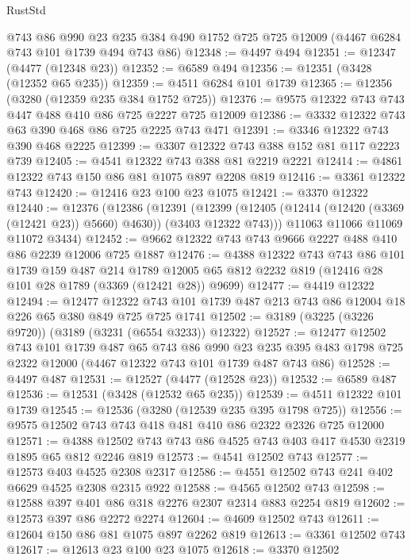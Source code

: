 \begin{lexlean}{RustStd}
\begin{coremodule}
    @743
    @86
    @990
    @23
    @235
    @384
    @490
    @1752
    @725
    @725
    @12009
    (@4467 @6284 @743 @101 @1739 @494 @743 @86)
@12348 := @4497 @494
@12351 := @12347 (@4477 (@12348 @23))
@12352 := @6589 @494
@12356 := @12351 (@3428 (@12352 @65 @235))
@12359 := @4511 @6284 @101 @1739
@12365 := @12356 (@3280 (@12359 @235 @384 @1752 @725))
@12376 := @9575 @12322 @743 @743 @447 @488 @410 @86 @725 @2227 @725 @12009
@12386 := @3332 @12322 @743 @63 @390 @468 @86 @725 @2225 @743 @471
@12391 := @3346 @12322 @743 @390 @468 @2225
@12399 := @3307 @12322 @743 @388 @152 @81 @117 @2223 @739
@12405 := @4541 @12322 @743 @388 @81 @2219 @2221
@12414 := @4861 @12322 @743 @150 @86 @81 @1075 @897 @2208 @819
@12416 := @3361 @12322 @743
@12420 := @12416 @23 @100 @23 @1075
@12421 := @3370 @12322
@12440 := @12376
    (@12386
      (@12391
        (@12399 (@12405 (@12414 (@12420 (@3369 (@12421 @23)) @5660) @4630)) (@3403 @12322 @743)))
      @11063
      @11066
      @11069
      @11072
      @3434)
@12452 := @9662 @12322 @743 @743 @9666 @2227 @488 @410 @86 @2239 @12006 @725 @1887
@12476 := @4388
    @12322
    @743
    @743
    @86
    @101
    @1739
    @159
    @487
    @214
    @1789
    @12005
    @65
    @812
    @2232
    @819
    (@12416 @28 @101 @28 @1789 (@3369 (@12421 @28)) @9699)
@12477 := @4419 @12322
@12494 := @12477
    @12322
    @743
    @101
    @1739
    @487
    @213
    @743
    @86
    @12004
    @18
    @226
    @65
    @380
    @849
    @725
    @725
    @1741
@12502 := @3189 (@3225 (@3226 @9720)) (@3189 (@3231 (@6554 @3233)) @12322)
@12527 := @12477
    @12502
    @743
    @101
    @1739
    @487
    @65
    @743
    @86
    @990
    @23
    @235
    @395
    @483
    @1798
    @725
    @2322
    @12000
    (@4467 @12322 @743 @101 @1739 @487 @743 @86)
@12528 := @4497 @487
@12531 := @12527 (@4477 (@12528 @23))
@12532 := @6589 @487
@12536 := @12531 (@3428 (@12532 @65 @235))
@12539 := @4511 @12322 @101 @1739
@12545 := @12536 (@3280 (@12539 @235 @395 @1798 @725))
@12556 := @9575 @12502 @743 @743 @418 @481 @410 @86 @2322 @2326 @725 @12000
@12571 := @4388 @12502 @743 @743 @86 @4525 @743 @403 @417 @4530 @2319 @1895 @65 @812 @2246 @819
@12573 := @4541 @12502 @743
@12577 := @12573 @403 @4525 @2308 @2317
@12586 := @4551 @12502 @743 @241 @402 @6629 @4525 @2308 @2315 @922
@12588 := @4565 @12502 @743
@12598 := @12588 @397 @401 @86 @318 @2276 @2307 @2314 @883 @2254 @819
@12602 := @12573 @397 @86 @2272 @2274
@12604 := @4609 @12502 @743
@12611 := @12604 @150 @86 @81 @1075 @897 @2262 @819
@12613 := @3361 @12502 @743
@12617 := @12613 @23 @100 @23 @1075
@12618 := @3370 @12502

\end{coremodule}
\end{lexlean}
